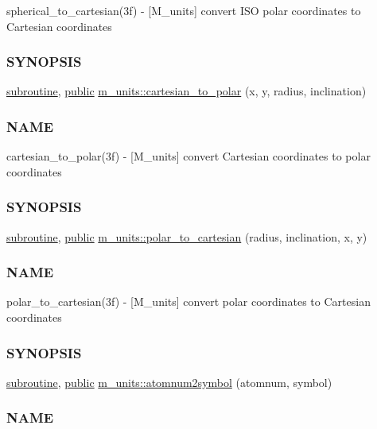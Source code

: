 \begin{DoxyCompactItemize}
\begin{DoxyCompactList}
spherical\+\_\+to\+\_\+cartesian(3f) -\/ \mbox{[}M\+\_\+units\mbox{]} convert I\+SO polar coordinates to Cartesian coordinates \subsubsection*{S\+Y\+N\+O\+P\+S\+IS}\end{DoxyCompactList}\item 
\hyperlink{M__stopwatch_83_8txt_acfbcff50169d691ff02d4a123ed70482}{subroutine}, \hyperlink{M__stopwatch_83_8txt_a2f74811300c361e53b430611a7d1769f}{public} \hyperlink{namespacem__units_a283a11d968cad968e33abfd6889de689}{m\+\_\+units\+::cartesian\+\_\+to\+\_\+polar} (x, y, radius, inclination)
\begin{DoxyCompactList}\small\item\em \subsubsection*{N\+A\+ME}

cartesian\+\_\+to\+\_\+polar(3f) -\/ \mbox{[}M\+\_\+units\mbox{]} convert Cartesian coordinates to polar coordinates \subsubsection*{S\+Y\+N\+O\+P\+S\+IS}\end{DoxyCompactList}\item 
\hyperlink{M__stopwatch_83_8txt_acfbcff50169d691ff02d4a123ed70482}{subroutine}, \hyperlink{M__stopwatch_83_8txt_a2f74811300c361e53b430611a7d1769f}{public} \hyperlink{namespacem__units_aa8b818c6ad24272b8c946b497041edc9}{m\+\_\+units\+::polar\+\_\+to\+\_\+cartesian} (radius, inclination, x, y)
\begin{DoxyCompactList}\small\item\em \subsubsection*{N\+A\+ME}

polar\+\_\+to\+\_\+cartesian(3f) -\/ \mbox{[}M\+\_\+units\mbox{]} convert polar coordinates to Cartesian coordinates \subsubsection*{S\+Y\+N\+O\+P\+S\+IS}\end{DoxyCompactList}\item 
\hyperlink{M__stopwatch_83_8txt_acfbcff50169d691ff02d4a123ed70482}{subroutine}, \hyperlink{M__stopwatch_83_8txt_a2f74811300c361e53b430611a7d1769f}{public} \hyperlink{namespacem__units_a09d8d6552dedf64faf635ea0ea6606ab}{m\+\_\+units\+::atomnum2symbol} (atomnum, symbol)
\begin{DoxyCompactList}\small\item\em \subsubsection*{N\+A\+ME}


\end{DoxyCompactList}
\end{DoxyCompactItemize}
